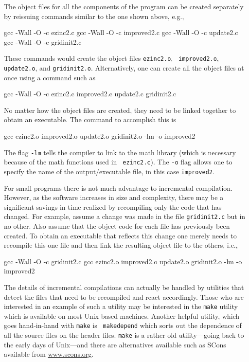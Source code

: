 The object files for all the components of the program can be created
separately by reissuing commands similar to the one shown above,
e.g., 
\begin{code}
  gcc -Wall -O -c ezinc2.c
  gcc -Wall -O -c improved2.c
  gcc -Wall -O -c update2.c
  gcc -Wall -O -c gridinit2.c
\end{code}
These commands would create the object files {\tt ezinc2.o}, {\tt
improved2.o}, {\tt update2.o}, and {\tt gridinit2.o}.  Alternatively,
one can create all the object files at once using a command such as
\begin{code}
  gcc -Wall -O -c ezinc2.c improved2.c update2.c gridinit2.c
\end{code}

No matter how the object files are created, they need to be linked
together to obtain an executable.  The command to accomplish this is
\begin{code}
  gcc ezinc2.o improved2.o update2.o gridinit2.o -lm -o improved2
\end{code}
The flag {\tt -lm} tells the compiler to link to the math library
(which is necessary because of the math functions used in {\tt
ezinc2.c}).  The {\tt -o} flag allows one to specify the name of the
output/executable file, in this case {\tt improved2}.

For small programs there is not much advantage to incremental
compilation.  However, as the software increases in size and
complexity, there may be a significant savings in time realized by
recompiling only the code that has changed.  For example, assume a
change was made in the file {\tt gridinit2.c} but in no other.  Also
assume that the object code for each file has previously been created.
To obtain an executable that reflects this change one merely needs to
recompile this one file and then link the resulting object file to the
others, i.e.,
\begin{code}
  gcc -Wall -O -c gridinit2.c
  gcc ezinc2.o improved2.o update2.o gridinit2.o -lm -o improved2
\end{code}

 The details of incremental compilations
can actually be handled by utilities that detect the files that need
to be recompiled and react accordingly.  Those who are interested in
an example of such a utility may be interested in the {\tt make}
utility which is available on most Unix-based machines.  Another
helpful utility, which goes hand-in-hand with {\tt make} is {\tt
  makedepend} which sorts out the dependence of all the source files
on the header files.  {\tt make} is a rather old utility---going back
to the early days of Unix---and there are alternatives available such
as SCons available from \url{www.scons.org}.

